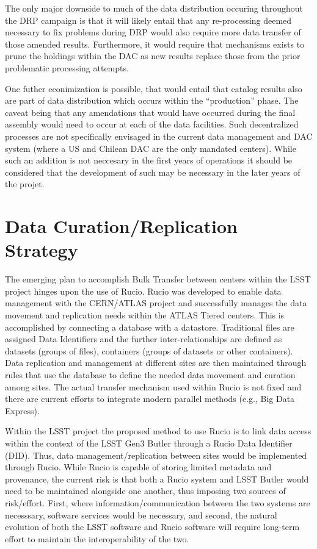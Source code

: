 The only major downside to much of the data distribution occuring throughout the DRP campaign is that it will likely entail that
any re-processing deemed necessary to fix problems during DRP would also require more data transfer of those amended results.
Furthermore, it would require that mechanisms exists to prune the holdings within the DAC as new results replace those from the 
prior problematic processing attempts.  

One futher econimization is possible, that would entail that catalog results also are part of data distribution which occurs within
the ``production'' phase.  The caveat being that any amendations that would have occurred during the final assembly would need to 
occur at each of the data facilities.  Such decentralized processes are not specifically envisaged in the current data management 
and DAC system (where a US and Chilean DAC are the only mandated centers).  While such an addition is not neccesary in the first
years of operations it should be considered that the development of such may be necessary in the later years of the projet.


\section{Data Curation/Replication Strategy\label{sec_method}}

The emerging plan to accomplish Bulk Transfer between centers within the LSST project hinges upon the use of Rucio.  
Rucio was developed to enable data management with the CERN/ATLAS project and successfully manages the data movement 
and replication needs within the ATLAS Tiered centers.  This is accomplished by connecting a database with a datastore.
Traditional files are assigned Data Identifiers and the further inter-relationships are defined as datasets (groups of 
files), containers (groups of datasets or other containers).   Data replication and management at different sites are then
maintained through rules that use the database to define the needed data movement and curation among sites.  The actual 
transfer mechanism used within Rucio is not fixed and there are current efforts to integrate modern parallel methods 
(e.g., Big Data Express).  

Within the LSST project the proposed method to use Rucio is to link data access within the context of the LSST Gen3 Butler 
through a Rucio Data Identifier (DID).  Thus, data management/replication between sites would be implemented through Rucio.  
While Rucio is capable of storing limited metadata and provenance, the current risk is that both a Rucio system and LSST Butler would
need to be maintained alongside one another, thus imposing two sources of risk/effort.  First, where information/communication
between the two systems are necesssary, software services would be necessary, and second, the natural evolution of both
the LSST software and Rucio software will require long-term effort to maintain the interoperability of the two.



